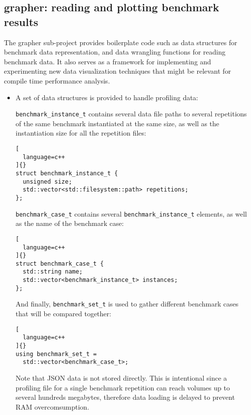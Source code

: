\documentclass[../main]{subfiles}
\begin{document}
\subsection{
  grapher: reading and plotting benchmark results
}

The grapher sub-project provides boilerplate code such as data structures
for benchmark data representation, and data wrangling functions for reading
benchmark data. It also serves as a framework for implementing and experimenting
new data visualization techniques that might be relevant for compile time
performance analysis.

\begin{itemize}
\item

  A set of data structures is provided to handle profiling data:

  \lstinline{benchmark_instance_t} contains several data file paths to several
  repetitions of the same benchmark instantiated at the same size, as well
  as the instantiation size for all the repetition files:

\begin{lstlisting}[
  language=c++
]{}
struct benchmark_instance_t {
  unsigned size;
  std::vector<std::filesystem::path> repetitions;
};
\end{lstlisting}

\clearpage%

  \lstinline{benchmark_case_t} contains several \lstinline{benchmark_instance_t}
  elements, as well as the name of the benchmark case:

\begin{lstlisting}[
  language=c++
]{}
struct benchmark_case_t {
  std::string name;
  std::vector<benchmark_instance_t> instances;
};
\end{lstlisting}

  And finally, \lstinline{benchmark_set_t} is used to gather
  different benchmark cases that will be compared together:

\begin{lstlisting}[
  language=c++
]{}
using benchmark_set_t =
  std::vector<benchmark_case_t>;
\end{lstlisting}

  Note that JSON data is not stored directly.
  This is intentional since a profiling file for a single benchmark repetition
  can reach volumes up to several hundreds megabytes, therefore data loading
  is delayed to prevent RAM overcomsumption.


\end{itemize}
\end{document}
